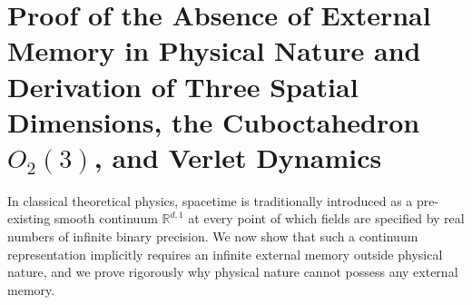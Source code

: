 \documentclass[11pt,a4paper]{article}
\theoremstyle{plain}
\theoremstyle{definition}
\begin{document}
\section{Proof of the Absence of External Memory in Physical Nature and Derivation of Three Spatial Dimensions, the Cuboctahedron \texorpdfstring{$O_2(3)$}{O2(3)}, and Verlet Dynamics}
\label{sec:axioms-uniqueness}

In classical theoretical physics, spacetime is traditionally introduced as a pre-existing smooth continuum $\mathbb{R}^{d,1}$ at every point of which fields are specified by real numbers of infinite binary precision. We now show that such a continuum representation implicitly requires an infinite external memory outside physical nature, and we prove rigorously why physical nature cannot possess any external memory.
\end{document}
